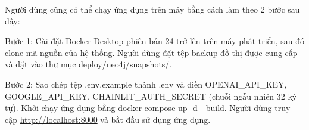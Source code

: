 \documentclass[../DoAn.tex]{subfiles}
\begin{document}
Người dùng cũng có thể chạy ứng dụng trên máy bằng cách làm theo 2 bước sau đây:

Bước 1: Cài đặt Docker Desktop phiên bản 24 trở lên trên máy phát triển, sau đó clone mã nguồn của hệ thống. Người dùng đặt tệp backup đồ thị được cung cấp và đặt vào thư mục deploy/neo4j/snapshots/.

Bước 2: Sao chép tệp .env.example thành .env và điền OPENAI\_API\_KEY, GOOGLE\_API\_KEY, CHAINLIT\_AUTH\_SECRET (chuỗi ngẫu nhiên 32 ký tự). Khởi chạy ứng dụng bằng docker compose up -d -{}-build. Người dùng truy cập \url{http://localhost:8000} và bắt đầu sử dụng ứng dụng.
\end{document}
